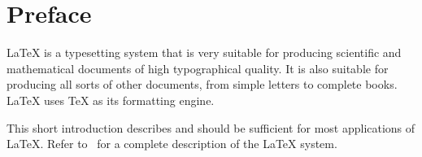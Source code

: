 

\chapter{Preface}

\LaTeX{} \cite{manual} is a typesetting system that is very 
suitable for producing scientific and mathematical documents of high
typographical quality. It is also suitable for producing all
sorts of other documents, from simple letters to complete books.
\LaTeX{} uses \TeX{} \cite{texbook} as its formatting engine.

This short introduction describes \LaTeXe{} and should be sufficient
for most applications of \LaTeX. Refer to~\cite{manual,companion} for
a complete description of the \LaTeX{} system.

